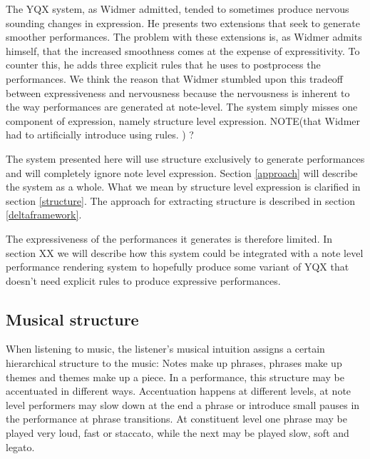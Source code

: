 \documentclass[a4paper,10pt]{article}
\begin{document}
The YQX system, as Widmer admitted, tended to sometimes produce nervous sounding changes in expression. He presents two extensions that seek to generate smoother performances. The problem with these extensions is, as Widmer admits himself, that the increased smoothness comes at the expense of expressitivity. To counter this, he adds three explicit rules that he uses to postprocess the performances. We think the reason that Widmer stumbled upon this tradeoff between expressiveness and nervousness because the nervousness is inherent to the way performances are generated at note-level. The system simply misses one component of expression, namely structure level expression. 
NOTE(that Widmer had to artificially introduce using rules. ) ?

The system presented here will use structure exclusively to generate performances and will completely ignore note level expression. Section \ref{approach} will describe the system as a whole. What we mean by structure level expression is clarified in section \ref{structure}. The approach for extracting structure is described in section \ref{deltaframework}.  

The expressiveness of the performances it generates is therefore limited. In section XX we will describe how this system could be integrated with a note level performance rendering system to hopefully produce some variant of YQX that doesn't need explicit rules to produce expressive performances.







\subsection{Musical structure}
When listening to music, the listener's musical intuition assigns a certain hierarchical structure to the music: Notes make up phrases, phrases make up themes and themes make up a piece. In a performance, this structure may be accentuated in different ways. Accentuation happens at different levels, at note level performers may slow down at the end a phrase or introduce small pauses in the performance at phrase transitions. At constituent level one phrase may be played very loud, fast or staccato, while the next may be played slow, soft and legato. 
\end{document}
